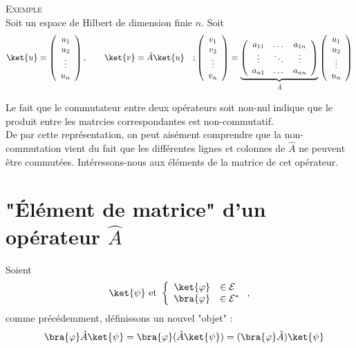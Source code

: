 \textsc{Exemple}\\
Soit un espace de Hilbert de dimension finie $n$. Soit
\begin{equation}
\ket{u} = \left(\begin{array}{c}
u_1\\
u_2\\
\vdots\\
u_n
\end{array}\right),\qquad \ket{v} = \hat{A}\ket{u}\quad ; \left(\begin{array}{c}
v_1\\
v_2\\
\vdots\\
v_n
\end{array}\right) = \underbrace{\left(\begin{array}{ccc}
a_{11} & \dots & a_{1n}\\
\vdots &\ddots &\vdots\\
a_{n1} & \dots & a_{nn}
\end{array}\right)}_{\hat{A}}\left(\begin{array}{c}
u_1\\
u_2\\
\vdots\\
u_n
\end{array}\right)
\end{equation}

Le fait que le commutateur entre deux opérateurs soit non-nul indique que le
produit entre les matrcies correspondantes est non-commutatif.\\

De par cette représentation, on peut aisément comprendre que la non-commutation 
vient du fait que les différentes lignes et colonnes de $\hat{A}$ ne peuvent 
être commutées. Intéressons-nous aux éléments de la matrice de cet opérateur.



\section{"Élément de matrice" d'un opérateur $\hat{A}$}

Soient
\begin{equation}
\ket{\psi} \text{ et } \left\{\begin{array}{ll}
\ket{\varphi} &\in \mathcal{E}\\
\bra{\varphi} &\in \mathcal{E}^*
\end{array}\right.,
\end{equation}
comme précédemment, définissons un nouvel "objet" :
\begin{equation}
 \quad \bra{\varphi}\hat{A}\ket{\psi} = \bra{\varphi}(
\hat{A}\ket{\psi}) = (\bra{\varphi}\hat{A})\ket{\psi}
\end{equation}

